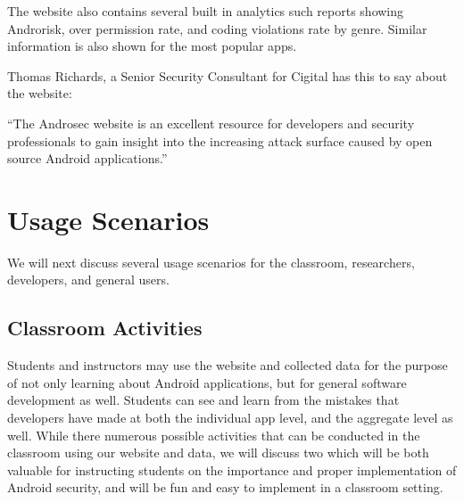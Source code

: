 \documentclass[journal,transmag]{IEEEtran}
\begin{document}
The website also contains several built in analytics such reports showing Androrisk, over permission rate, and coding violations rate by genre. Similar information is also shown for the most popular apps.


Thomas Richards, a Senior Security Consultant for Cigital has this to say about the website:

{\selectfont
``The Androsec website is an excellent resource for developers and security professionals to gain insight into the increasing attack surface caused by open source Android applications.''
}













\section{Usage Scenarios}
\label{sec: usagescenarios}
We will next discuss several usage scenarios for the classroom, researchers, developers, and general users.




\subsection{Classroom Activities} %

Students and instructors may use the website and collected data for the purpose of not only learning about Android applications, but for general software development as well. Students can see and learn from the mistakes that developers have made at both the individual app level, and the aggregate level as well. While there numerous possible activities that can be conducted in the classroom using our website and data, we will discuss two which will be both valuable for instructing students on the importance and proper implementation of Android security, and will be fun and easy to implement in a classroom setting.
\end{document}
